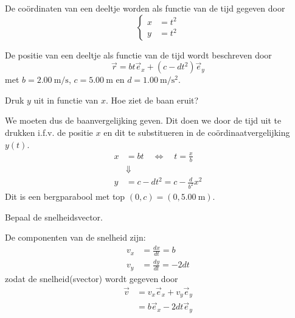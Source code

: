 \documentclass{ximera}
\begin{document}
\begin{exercise}
	De coördinaten van een deeltje worden als functie van de tijd gegeven door
	\[
	\left\{
	\begin{aligned}
		x&=t^2 \\
		y&=t^2
	\end{aligned}
	\right.
	\]

	\begin{multipleChoice}
	\end{multipleChoice}
\end{exercise}

\begin{exercise}
	De positie van een deeltje als functie van de tijd wordt beschreven door
	\[
	\vec{r}=bt\vec{e}_x+(c-dt^2)\vec{e}_y
	\]
	met $b=\SI{2,00}{\meter\per\second}$, $c=\SI{5,00}{\meter}$ en $d=\SI{1,00}{\meter\per\second\squared}$.
	
	\begin{question}
	Druk $y$ uit in functie van $x$. Hoe ziet de baan eruit?
	
	\begin{oplossing}
	We moeten dus de baanvergelijking geven. 
	Dit doen we door de tijd uit te drukken i.f.v. de positie $x$ en dit te substitueren in de coördinaatvergelijking $y(t)$.
	\begin{align*}
	x&=bt \quad \Leftrightarrow \quad t=\frac{x}{b}\\
	&\Downarrow\\
	y&=c-dt^2=c-\frac{d}{b^2}x^2
	\end{align*}
	Dit is een bergparabool met top $(0,c)=(0,\SI{5,00}{\meter})$.
	\end{oplossing}
	\end{question}
	
	\begin{question}
	Bepaal de snelheidsvector.
	
	\begin{oplossing}
	De componenten van de snelheid zijn:
	\begin{align*}
	v_x&=\frac{dx}{dt}=b\\
	v_y&=\frac{dy}{dt}=-2dt
	\end{align*}
	zodat de snelheid(svector) wordt gegeven door
	\begin{align*}
	\vec{v}&=v_x\vec{e}_x+v_y\vec{e}_y\\
	&=b\vec{e}_x-2dt\vec{e}_y
	\end{align*}
	\end{oplossing}
	\end{question}
	

\end{exercise}
\end{document}
